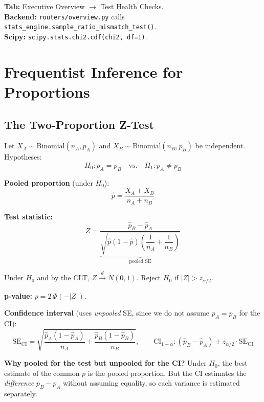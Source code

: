 \documentclass[11pt,a4paper]{article}
\newcommand{\code}[1]{\texttt{#1}}
\begin{document}
\vspace{8pt}

\begin{dashlink}
\textbf{Tab:} Executive Overview $\to$ Test Health Checks.\\
\textbf{Backend:} \code{routers/overview.py} calls \code{stats\_engine.sample\_ratio\_mismatch\_test()}.\\
\textbf{Scipy:} \code{scipy.stats.chi2.cdf(chi2, df=1)}.
\end{dashlink}


\section{Frequentist Inference for Proportions}

\subsection{The Two-Proportion Z-Test}

\begin{formaldef}
Let $X_A \sim \mathrm{Binomial}(n_A, p_A)$ and $X_B \sim \mathrm{Binomial}(n_B, p_B)$ be independent. Hypotheses:
\[
H_0: p_A = p_B \quad \text{vs.} \quad H_1: p_A \neq p_B
\]

\textbf{Pooled proportion} (under $H_0$):
\[
\hat{p} = \frac{X_A + X_B}{n_A + n_B}
\]

\textbf{Test statistic:}
\[
Z = \frac{\hat{p}_B - \hat{p}_A}{\underbrace{\sqrt{\hat{p}(1-\hat{p})\left(\dfrac{1}{n_A} + \dfrac{1}{n_B}\right)}}_{\text{pooled SE}}}
\]

Under $H_0$ and by the CLT, $Z \xrightarrow{d} N(0,1)$. Reject $H_0$ if $|Z| > z_{\alpha/2}$.

\medskip
\textbf{p-value:} $p = 2\,\Phi(-|Z|)$.

\medskip
\textbf{Confidence interval} (uses \emph{unpooled} SE, since we do not assume $p_A = p_B$ for the CI):
\[
\mathrm{SE}_{\mathrm{CI}} = \sqrt{\frac{\hat{p}_A(1-\hat{p}_A)}{n_A} + \frac{\hat{p}_B(1-\hat{p}_B)}{n_B}}, \qquad \mathrm{CI}_{1-\alpha}: (\hat{p}_B - \hat{p}_A) \pm z_{\alpha/2} \cdot \mathrm{SE}_{\mathrm{CI}}
\]

\textbf{Why pooled for the test but unpooled for the CI?} Under $H_0$, the best estimate of the common $p$ is the pooled proportion. But the CI estimates the \emph{difference} $p_B - p_A$ without assuming equality, so each variance is estimated separately.
\end{formaldef}
\end{document}
